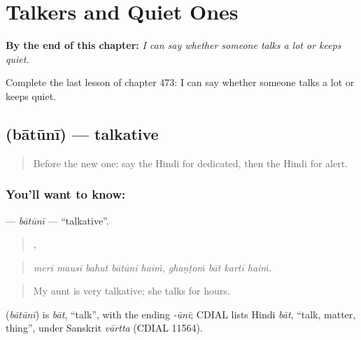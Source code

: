 
\chapter{Talkers and Quiet Ones}
\label{ch:hi-talkers-and-quiet-ones}

\begin{chapteropening}
\textbf{By the end of this chapter:} \emph{I can say whether someone talks a lot or keeps quiet.}

Complete the last lesson of chapter 473: I can say whether someone talks a lot or keeps quiet.
\end{chapteropening}

\section[\texorpdfstring{\hi{बातूनी} (bātūnī)}{बातूनी (bātūnī)}]{ (bātūnī) — talkative}

\label{lesson:HI-C473-batuni}



\begin{quote}
Before the new one: say the Hindi for dedicated, then the Hindi for alert.
\end{quote}

\subsection*{You'll want to know: }
\textbf{} — \emph{bātūnī} — \textquotedblleft{}talkative\textquotedblright{}.

\begin{quote}
    ,    
\end{quote}

\begin{quote}
\emph{merī mausī bahut bātūnī haiṁ, ghaṇṭoṁ bāt kartī haiṁ.}
\end{quote}

\begin{quote}
My aunt is very talkative; she talks for hours.
\end{quote}

\begin{cousinweb}
\textbf{} (\emph{bātūnī}) is \emph{bāt}, \textquotedblleft{}talk\textquotedblright{}, with the ending \emph{-ūnī}; CDIAL lists Hindi \emph{bāt}, \textquotedblleft{}talk, matter, thing\textquotedblright{}, under Sanskrit \emph{vārtta} (CDIAL 11564).
\end{cousinweb}

